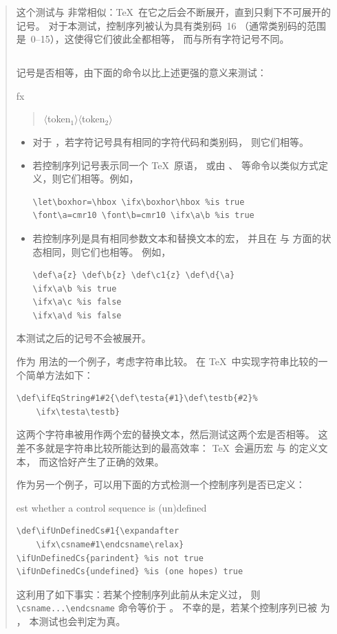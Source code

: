 \documentclass[a4paper]{rapport3}
\makeatletter
\def\gr#1{$\langle$#1$\rangle$}\def\key#1{{\tt#1}}
\newenvironment{disp}{\begin{quotation}}{\end{quotation}}
\newenvironment{Disp}{\begin{quotation}}{\end{quotation}}
\def\howto#1\par{}
\def\cstoidx#1\par{\index{#1@\cs{#1}}}
\makeatother
\begin{document}
\begin{disp}
这个测试与  非常相似：\TeX\ 在它之后会不断展开，直到只剩下不可展开的记号。
对于本测试，控制序列被认为具有类别码~16
（通常类别码的范围是~0--15），这使得它们彼此全都相等，
而与所有字符记号不同。

\subsection{\protect{}}

记号是否相等，由下面的命令以比上述更强的意义来测试：
\cstoidx ifx\par
\begin{Disp}\gr{token$_1$}\gr{token$_2$}\end{Disp}

\begin{itemize}\item 对于 ，若字符记号具有相同的字符代码和类别码，
则它们相等。
    \item 若控制序列记号表示同一个 \TeX\ 原语，
或由 、 等命令以类似方式定义，则它们相等。例如，
\begin{verbatim}
\let\boxhor=\hbox \ifx\boxhor\hbox %is true
\font\a=cmr10 \font\b=cmr10 \ifx\a\b %is true
\end{verbatim}
\item 若控制序列是具有相同参数文本和替换文本的宏，
并且在  与  方面的状态相同，则它们也相等。
例如，
\begin{verbatim}
\def\a{z} \def\b{z} \def\c1{z} \def\d{\a}
\ifx\a\b %is true
\ifx\a\c %is false
\ifx\a\d %is false
\end{verbatim}
\end{itemize}

本测试之后的记号不会被展开。

作为  用法的一个例子，考虑字符串比较。
在 \TeX\ 中实现字符串比较的一个简单方法如下：
\begin{verbatim}
\def\ifEqString#1#2{\def\testa{#1}\def\testb{#2}%
    \ifx\testa\testb}
\end{verbatim}
这两个字符串被用作两个宏的替换文本，然后测试这两个宏是否相等。
这差不多就是字符串比较所能达到的最高效率：
\TeX\ 会遍历宏  与  的定义文本，
而这恰好产生了正确的效果。

作为另一个例子，可以用下面的方式检测一个控制序列是否已定义：\howto Test whether a control sequence is (un)defined\par
\begin{verbatim}
\def\ifUnDefinedCs#1{\expandafter
    \ifx\csname#1\endcsname\relax}
\ifUnDefinedCs{parindent} %is not true
\ifUnDefinedCs{undefined} %is (one hopes) true
\end{verbatim}
这利用了如下事实：若某个控制序列此前从未定义过，
则 \verb>\csname...\endcsname> 命令等价于 。
不幸的是，若某个控制序列已被  为 ，
本测试也会判定为真。


\end{disp}
\end{document}
